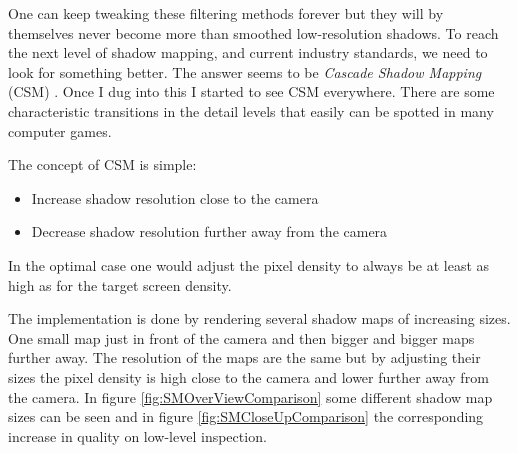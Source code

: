 One can keep tweaking these filtering methods forever but they will by themselves never become more than smoothed low-resolution shadows. To reach the next level of shadow mapping, and current industry standards, we need to look for something better. The answer seems to be \textit{Cascade Shadow Mapping} (CSM) \cite{CascadeShadowMapping}. Once I dug into this I started to see CSM everywhere. There are some characteristic transitions in the detail levels that easily can be spotted in many computer games.

The concept of CSM is simple:

\begin{itemize}
\item Increase shadow resolution close to the camera
\item Decrease shadow resolution further away from the camera
\end{itemize}

In the optimal case one would adjust the pixel density to always be at least as high as for the target screen density. 

The implementation is done by rendering several shadow maps of increasing sizes. One small map just in front of the camera and then bigger and bigger maps further away. The resolution of the maps are the same but by adjusting their sizes the pixel density is high close to the camera and lower further away from the camera. In figure \ref{fig:SMOverViewComparison} some different shadow map sizes can be seen and in figure \ref{fig:SMCloseUpComparison} the corresponding increase in quality on low-level inspection. 

